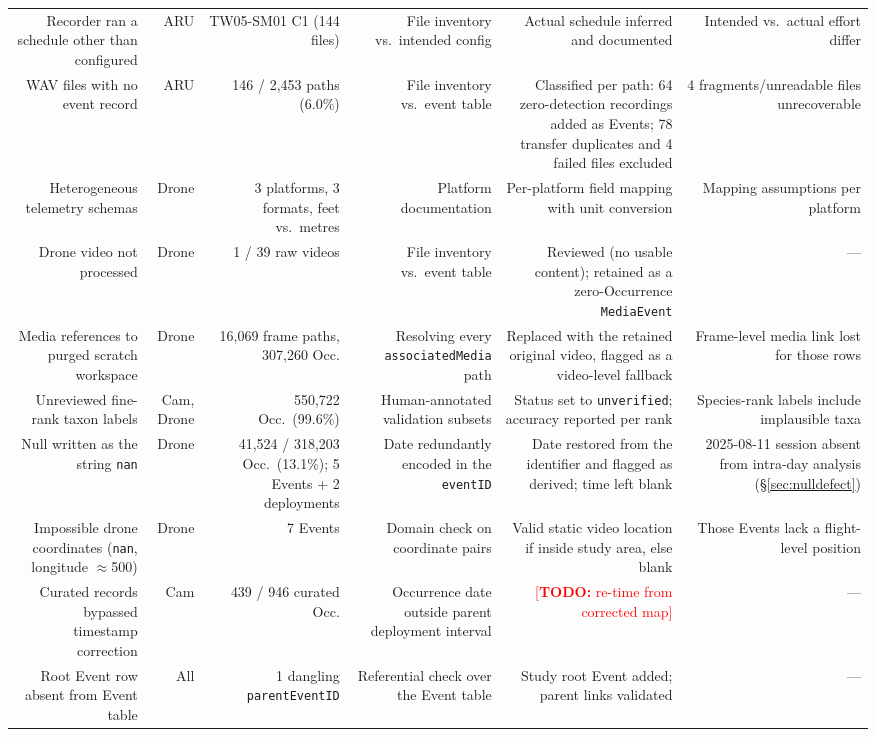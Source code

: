 \documentclass[sigconf]{acmart}
\newcommand{\TODO}[1]{\textcolor{red}{\footnotesize[\textbf{TODO:} #1]}}
\newcommand{\TODO}[1]{}
\begin{document}
\begin{table}[t]
\begin{tabularx}{\textwidth}{R{1.09}R{0.39}R{1.09}R{1.09}R{1.17}R{1.17}}
Recorder ran a schedule other than configured & ARU & TW05-SM01 C1 (144 files) & File inventory vs.\ intended config & Actual schedule inferred and documented & Intended vs.\ actual effort differ \\
WAV files with no event record & ARU & 146 / 2{,}453 paths (6.0\%) & File inventory vs.\ event table & Classified per path: 64 zero-detection recordings added as Events; 78 transfer duplicates and 4 failed files excluded & 4 fragments/unreadable files unrecoverable \\
Heterogeneous telemetry schemas & Drone & 3 platforms, 3 formats, feet vs.\ metres & Platform documentation & Per-platform field mapping with unit conversion & Mapping assumptions per platform \\
Drone video not processed & Drone & 1 / 39 raw videos & File inventory vs.\ event table & Reviewed (no usable content); retained as a zero-Occurrence \texttt{MediaEvent} & --- \\
Media references to purged scratch workspace & Drone & 16{,}069 frame paths, 307{,}260 Occ. & Resolving every \texttt{associatedMedia} path & Replaced with the retained original video, flagged as a video-level fallback & Frame-level media link lost for those rows \\
Unreviewed fine-rank taxon labels & Cam, Drone & 550{,}722 Occ.\ (99.6\%) & Human-annotated validation subsets & Status set to \texttt{unverified}; accuracy reported per rank & Species-rank labels include implausible taxa \\
Null written as the string \texttt{nan} & Drone & 41{,}524 / 318{,}203 Occ.\ (13.1\%); 5 Events + 2 deployments & Date redundantly encoded in the \texttt{eventID} & Date restored from the identifier and flagged as derived; time left blank & 2025-08-11 session absent from intra-day analysis (\S\ref{sec:nulldefect}) \\
Impossible drone coordinates (\texttt{nan}, longitude $\approx$500) & Drone & 7 Events & Domain check on coordinate pairs & Valid static video location if inside study area, else blank & Those Events lack a flight-level position \\
Curated records bypassed timestamp correction & Cam & 439 / 946 curated Occ. & Occurrence date outside parent deployment interval & \TODO{re-time from corrected map} & --- \\
Root Event row absent from Event table & All & 1 dangling \texttt{parentEventID} & Referential check over the Event table & Study root Event added; parent links validated & --- \\

\end{tabularx}
\end{table}
\end{document}
